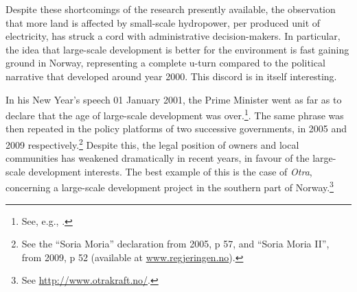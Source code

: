 Despite these shortcomings of the research presently available, the observation that more land is affected by small-scale hydropower, per produced unit of electricity, has struck a cord with administrative decision-makers. In particular, the idea that large-scale development is better for the environment is fast gaining ground in Norway, representing a complete u-turn compared to the political narrative that developed around year 2000. This discord is in itself interesting. 

In his New Year's speech 01 January 2001, the Prime Minister went as far as to declare that the age of large-scale development was over.\footnote{See, e.g., \cite[34]{haltbrekken12}.}. The same phrase was then repeated in the policy platforms of two successive governments, in 2005 and 2009 respectively.\footnote{See the ``Soria Moria'' declaration from 2005, p 57, and ``Soria Moria II'', from 2009, p 52 (available at \url{www.regjeringen.no}).} Despite this, the legal position of owners and local communities has weakened dramatically in recent years, in favour of the large-scale development interests. The best example of this is the case of {\it Otra}, concerning a large-scale development project in the southern part of Norway.\footnote{See \url{http://www.otrakraft.no/}.} 

